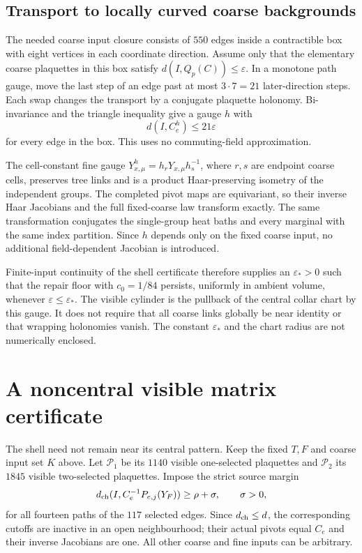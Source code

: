 \documentclass[11pt,oneside,openany]{book}
\theoremstyle{definition}
\theoremstyle{remark}
\newcommand{\src}[2]{\cite[#2]{#1}}
\begin{document}
\subsection{Transport to locally curved coarse backgrounds}
\label{sec:coarse-gauge-repair}
The needed coarse input closure consists of $550$ edges inside a
contractible box with eight vertices in each coordinate direction.
Assume only that the elementary coarse plaquettes in this box satisfy
$d(I,Q_p(C))\le\varepsilon$. In a monotone path gauge, move the last
step of an edge past at most $3\cdot7=21$ later-direction steps.
Each swap changes the transport by a conjugate plaquette holonomy.
Bi-invariance and the triangle inequality give a gauge $h$ with
\begin{equation}\label{eq:local-box-gauge}
 d(I,C_e^h)\le21\varepsilon
\end{equation}
for every edge in the box. This uses no commuting-field approximation.

The cell-constant fine gauge
$Y_{x,\mu}^h=h_rY_{x,\mu}h_s^{-1}$, where $r,s$ are endpoint coarse
cells, preserves tree links and is a product Haar-preserving isometry
of the independent groups. The completed pivot maps are equivariant,
so their inverse Haar Jacobians and the full fixed-coarse law transform
exactly. The same transformation conjugates the single-group heat
baths and every marginal with the same index partition. Since $h$
depends only on the fixed coarse input, no additional field-dependent
Jacobian is introduced.

Finite-input continuity of the shell certificate therefore supplies
an $\varepsilon_*>0$ such that the repair floor with $c_0=1/84$
persists, uniformly in ambient volume, whenever
$\varepsilon\le\varepsilon_*$. The visible cylinder is the pullback
of the central collar chart by this gauge. It does not require that
all coarse links globally be near identity or that wrapping holonomies
vanish. The constant $\varepsilon_*$ and the chart radius are not
numerically enclosed. \src{F13}{V15}

\section{A noncentral visible matrix certificate}
\label{sec:matrix-repair}
The shell need not remain near its central pattern. Keep the fixed
$T,F$ and coarse input set $K$ above. Let $\mathcal P_1$ be its $1140$
visible one-selected plaquettes and $\mathcal P_2$ its $1845$ visible
two-selected plaquettes. Impose the strict source margin
\begin{equation}\label{eq:inactive-margin}
 d_{\rm ch}(I,C_e^{-1}P_{e,j}(Y_F))\ge\rho+\sigma,
 \qquad \sigma>0,
\end{equation}
for all fourteen paths of the $117$ selected edges. Since
$d_{\rm ch}\le d$, the corresponding cutoffs are inactive in an
open neighbourhood; their actual pivots equal $C_e$ and their inverse
Jacobians are one. All other coarse and fine inputs can be arbitrary.
\end{document}
